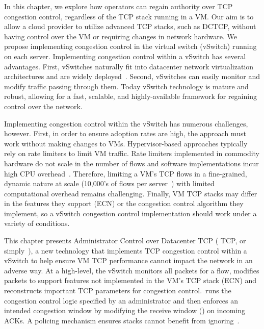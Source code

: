 In this chapter, we explore how operators can regain authority over TCP congestion control, regardless of the TCP stack
running in a VM. Our aim is to allow a cloud provider to utilize advanced TCP stacks, such as DCTCP, without having
control over the VM or requiring changes in network hardware. We propose implementing congestion control in the virtual switch
(vSwitch) running on each server. Implementing congestion control within a vSwitch has several advantages. 
First, vSwitches naturally fit into datacenter network virtualization architectures and are widely
deployed~\cite{Pfaff2015ovs}. Second, vSwitches can easily monitor and modify traffic passing through them. 
Today vSwitch technology is mature and robust, allowing for a fast, scalable,
and highly-available framework for regaining control over the network. 


Implementing congestion control within the vSwitch has numerous challenges, however. First, in order to ensure adoption rates are high, the 
approach must work without making changes to VMs. 
Hypervisor-based approaches typically rely on rate limiters to limit VM traffic. Rate limiters implemented in
commodity hardware do not scale in the number of flows and software implementations incur high CPU overhead~\cite{radhakrishnan2014senic}. 
Therefore, limiting a VM's TCP flows in a fine-grained, dynamic nature
at scale (10,000's of flows per server~\cite{180302}) with limited computational overhead remains challenging. 
Finally, VM TCP stacks may differ in the features they support (\eg{}ECN) or the congestion
control algorithm they implement, so a vSwitch congestion control implementation should work under a variety
of conditions. 

This chapter presents Administrator Control over Datacenter TCP (\acdc{} TCP, or simply~\acdc{}), a new technology that implements 
TCP congestion control within a vSwitch to help ensure VM
TCP performance cannot impact the network in an adverse way. At a high-level, the vSwitch monitors all packets for a flow, modifies 
packets to support features not implemented in the VM's TCP stack (\eg{}ECN) and reconstructs
important TCP parameters for congestion control.~\acdc runs the congestion control logic specified by an administrator and then enforces an intended
congestion window by modifying the receive window (\rwnd{}) on incoming ACKs. A policing
mechanism ensures stacks cannot benefit from ignoring~\rwnd{}.%

